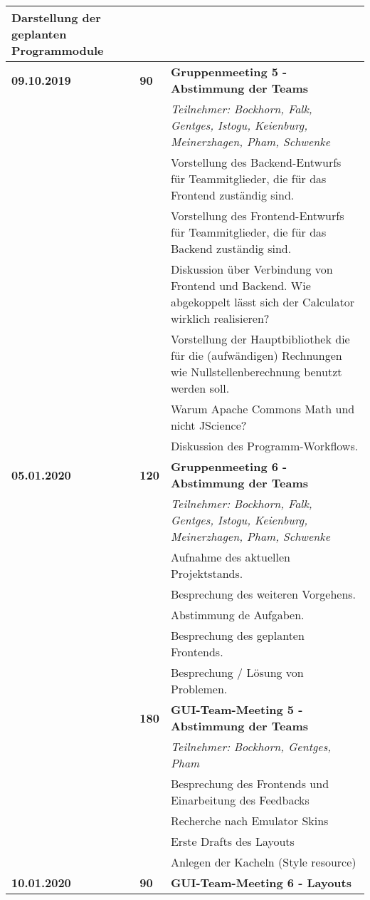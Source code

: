 {{\begin{longtable}{|l|l|p{11cm}|}
			Darstellung der geplanten Programmodule			
	\\\hline
		\textbf{09.10.2019} 
			& \textbf{\hfill90} & \textbf{Gruppenmeeting 5 - Abstimmung der Teams}
			\\ & &
			\small{\textit{Teilnehmer: Bockhorn, Falk, Gentges, Istogu, Keienburg, Meinerzhagen, Pham, Schwenke}}
			\\ & &
			Vorstellung des Backend-Entwurfs für Teammitglieder, die für das Frontend zuständig sind.
			\\ & &
			Vorstellung des Frontend-Entwurfs für Teammitglieder, die für das Backend zuständig sind.
			\\ & &
			Diskussion über Verbindung von Frontend und Backend. Wie abgekoppelt lässt sich der Calculator wirklich realisieren?
			\\ & &
			Vorstellung der Hauptbibliothek die für die (aufwändigen) Rechnungen wie Nullstellenberechnung benutzt werden soll.
			\\ & &
			Warum Apache Commons Math und nicht JScience?
			\\ & &
			Diskussion des Programm-Workflows.
	\\ \hline
		\textbf{05.01.2020} 
			& \textbf{\hfill120} & \textbf{Gruppenmeeting 6 - Abstimmung der Teams}
			\\ & &
			\small{\textit{Teilnehmer: Bockhorn, Falk, Gentges, Istogu, Keienburg, Meinerzhagen, Pham, Schwenke}}
			\\ & &
			Aufnahme des aktuellen Projektstands.
			\\ & &
			Besprechung des weiteren Vorgehens.
			\\ & &
			Abstimmung de Aufgaben.
			\\ & &
			Besprechung des geplanten Frontends.
			\\ & &
			Besprechung / Lösung von Problemen.
		\\ \cline{2-3}
		& \textbf{\hfill180} & \textbf{GUI-Team-Meeting 5 - Abstimmung der Teams} 
			\\ & &
			\small{\textit{Teilnehmer: Bockhorn, Gentges, Pham}}
			\\ & &
			Besprechung des Frontends und Einarbeitung des Feedbacks
			\\ & &
			Recherche nach Emulator Skins
			\\ & &
			Erste Drafts des Layouts
			\\ & &
			Anlegen der Kacheln (Style resource)	
	\\ \hline
		\textbf{10.01.2020} 
			& \textbf{\hfill90} & \textbf{GUI-Team-Meeting 6 - Layouts}

\end{longtable}}}
